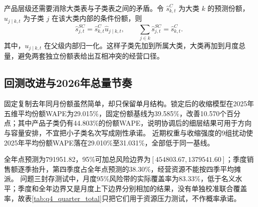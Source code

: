 产品层级还需要消除大类表与子类表之间的矛盾。令 $\widehat s^C_{k,t}$ 为大类 $k$ 的预测份额，$\widehat u_{j\mid k,t}$ 为子类 $j$ 在该大类内部的条件份额，则
\begin{equation}
    \widehat s^{SC}_{j,t}=\widehat s^C_{k,t}\widehat u_{j\mid k,t},
    \qquad
    \sum_{j\in k}\widehat s^{SC}_{j,t}=\widehat s^C_{k,t}.
\end{equation} %
其中，$\widehat u_{j\mid k,t}$ 在父级内部归一化。这样子类先加到所属大类，大类再加到月度总量，避免两套独立份额表给出互相冲突的经营口径。

\subsection{回测改进与2026年总量节奏} %

固定复制去年同月份额虽然简单，却只保留单月结构。锁定后的收缩模型在2025年五维平均份额WAPE为29.015\%，固定份额基线为39.585\%，改善10.570个百分点；其中产品子类仍有44.803\%的份额WAPE，说明协调后的细层结果可用于方向与容量安排，不宜把小子类名次写成刚性承诺。%
近期权重与收缩强度的9组扰动使2025年平均份额WAPE落在29.010\%至31.031\%，全部低于同一基线。%

全年点预测为791951.82，95\%可加总风险边界为$[454803.67,1379541.60]$；季度销售额逐季抬升，第四季度占全年点预测的38.30\%，经营资源不能按四季平均摊派。%
问题三封存测试中，月度95\%风险带的实际覆盖率为83.33\%，低于名义水平；季度和全年边界又是月度上下边界分别相加的结果，没有单独校准联合覆盖率，故表\ref{tab:q4_quarter_total}只把它们用于资源压力测试，不作概率承诺。%

